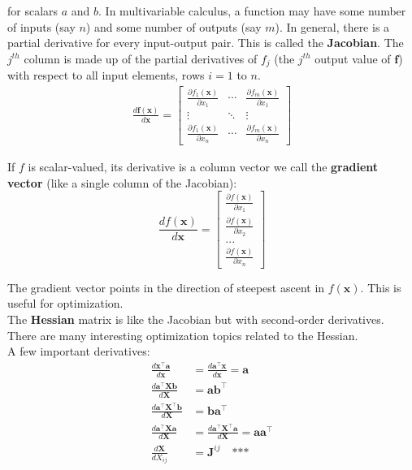 \documentclass{harvardml}
\theoremstyle{definition}
\theoremstyle{plain}
\newcommand{\p}{\partial}
\renewcommand{\v}[1]{\mathbf{#1}}
\begin{document}
            \noindent for scalars $a$ and $b$. In multivariable calculus, 
			a function may have some number of inputs (say $n$) and some 
			number of outputs (say $m$). In general, there is a partial 
			derivative for every input-output pair. This is called the 
			\textbf{Jacobian}. The $j^{th}$ column is made up of the partial 
			derivatives of $f_j$ (the $j^{th}$ output value of $\v f$) with 
			respect to all input elements, rows $i=1$ to $n$.
            \begin{align*}
                \frac{d \mathbf{f}(\mathbf{x})}{d \mathbf{x}} = 
				\begin{bmatrix}
                    \frac{\p f_1(\mathbf{x})}{\p x_1} & 
					\cdots & 
					\frac{\p f_m(\mathbf{x})}{\p x_1} \\
                    \vdots & \ddots & \vdots \\
                    \frac{\p f_1(\mathbf{x})}{\p x_n} & 
					\cdots & \frac{\p f_m(\mathbf{x})}{\p x_n}
                \end{bmatrix}
            \end{align*}
                
            \noindent If $f$ is scalar-valued, its derivative is a 
			column vector we call the \textbf{gradient vector} 
			(like a single column of the Jacobian):
            $$
                 \frac{d f(\mathbf{x})}{d \mathbf{x}}=\begin{bmatrix}
                 \frac{\p f(\mathbf{x})}{\p x_1} \\
                 \frac{\p f(\mathbf{x})}{\p x_2} \\
                 ... \\
                 \frac{\p f(\mathbf{x})}{\p x_n}
                 \end{bmatrix}
            $$

            \noindent The gradient vector points in the direction of 
			steepest ascent in $f(\mathbf{x})$. This is useful for 
			optimization.\\

            \noindent The \textbf{Hessian} matrix is like the Jacobian but with
            second-order derivatives. There are many interesting optimization
            topics related to the Hessian.\\

            \noindent A few important derivatives:
            \begin{align*}
                \frac{d \v x^\top \v a}{d \v x}
                    &= \frac{d \v a^\top \v x }{d \v x} = \v a\\
                \frac{d \v a^\top \v X \v b}{d \v X} &= \v a \v b^\top\\
                \frac{d \v a^\top \v X^\top \v b}{d \v X} &= \v b \v a^\top\\
                \frac{d \v a^\top \v X \v a}{d \v X} &=
                        \frac{d \v a^\top \v X^\top \v a}{d \v X} = 
                        \v a \v a^\top\\
                \frac{d \v X}{d X_{ij}} &= \v J^{ij} \quad \text{***}
            \end{align*}                
                
\end{document}
